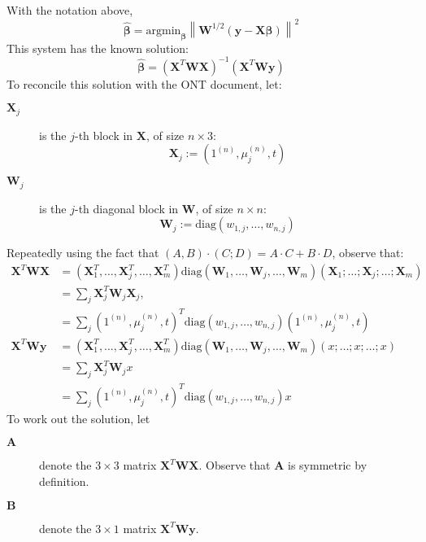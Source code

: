\documentclass{article}
\begin{document}
With the notation above,
\[
\hat{\bm{\beta}} = \mathrm{argmin}_{\bm{\beta}} \left\| \bm{W}^{1/2} (\bm{y} - \bm{X} \bm{\beta}) \right\|^2
\]
This system has the known solution:
\[
\hat{\bm{\beta}} = \left( \bm{X}^T \bm{W} \bm{X} \right)^{-1} \left( \bm{X}^T \bm{W} \bm{y} \right)
\]
To reconcile this solution with the ONT document, let:
\begin{description}
\item[$\bm{X}_j$] is the $j$-th block in $\bm{X}$, of size $n \times 3$:
\[
\bm{X}_j := \left( 1^{(n)}, \mu_j^{(n)}, t \right)
\]

\item[$\bm{W}_j$] is the $j$-th diagonal block in $\bm{W}$, of size $n \times n$:
\[
\bm{W}_j := \mathrm{diag} \left( w_{1,j}, \dots, w_{n,j} \right)
\]
\end{description}
Repeatedly using the fact that $(A,B) \cdot (C;D) = A \cdot C + B \cdot D$, observe that:
\begin{align*}
\bm{X}^T \bm{W} \bm{X} & = \left(\bm{X}_1^T, \dots, \bm{X}_j^T, \dots, \bm{X}_m^T \right)
\mathrm{diag} \left( \bm{W}_1, \dots, \bm{W}_j, \dots, \bm{W}_m \right)
\left(\bm{X}_1; \dots; \bm{X}_j; \dots; \bm{X}_m \right) \\
& = \sum_j \bm{X}_j^T \bm{W}_j \bm{X}_j, \\
& = \sum_j \left( 1^{(n)}, \mu_j^{(n)}, t \right)^T
\mathrm{diag} \left( w_{1,j}, \dots, w_{n,j} \right)
\left( 1^{(n)}, \mu_j^{(n)}, t \right) \\
\bm{X}^T \bm{W} \bm{y} & = \left(\bm{X}_1^T, \dots, \bm{X}_j^T, \dots, \bm{X}_m^T \right)
\mathrm{diag} \left( \bm{W}_1, \dots, \bm{W}_j, \dots, \bm{W}_m \right)
\left( x; \dots; x; \dots; x \right) \\
& = \sum_j \bm{X}_j^T \bm{W}_j x \\
& = \sum_j \left( 1^{(n)}, \mu_j^{(n)}, t \right)^T
\mathrm{diag} \left( w_{1,j}, \dots, w_{n,j} \right)
x
\end{align*}
To work out the solution, let
\begin{description}
\item[$\bm{A}$] denote the $3 \times 3$ matrix $\bm{X}^T \bm{W} \bm{X}$. Observe that $\bm{A}$ is symmetric by definition.

\item[$\bm{B}$] denote the $3 \times 1$ matrix $\bm{X}^T \bm{W} \bm{y}$.
\end{description}
\end{document}
